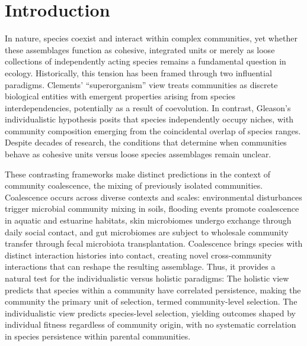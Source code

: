 \section{Introduction}
\label{sec:introduction}

In nature, species coexist and interact within complex communities, yet whether these assemblages function as cohesive, integrated units or merely as loose collections of independently acting species remains a fundamental question in ecology. Historically, this tension has been framed through two influential paradigms. Clements' ``superorganism'' view treats communities as discrete biological entities with emergent properties arising from species interdependencies, potentially as a result of coevolution\citep{Clements1916, Clements1936, Odum1969, Lovelock1979, WilsonSober1989}. In contrast, Gleason's individualistic hypothesis posits that species independently occupy niches, with community composition emerging from the coincidental overlap of species ranges\citep{Gleason1939, Cain1947, Mason1947, Whittaker1967}. Despite decades of research, the conditions that determine when communities behave as cohesive units versus loose species assemblages remain unclear.

These contrasting frameworks make distinct predictions in the context of community coalescence, the mixing of previously isolated communities\citep{Rillig2015, Lechon2021}. Coalescence occurs across diverse contexts and scales: environmental disturbances trigger microbial community mixing in soils\citep{Huet2023, Bresciani2025}, flooding events promote coalescence in aquatic and estuarine habitats\citep{Liu2024}, skin microbiomes undergo exchange through daily social contact\citep{Sarkar2024}, and gut microbiomes are subject to wholesale community transfer through fecal microbiota transplantation\citep{Xiao2020, Gupta2016}. Coalescence brings species with distinct interaction histories into contact, creating novel cross-community interactions that can reshape the resulting assemblage\citep{Rillig2015}. Thus, it provides a natural test for the individualistic versus holistic paradigms: The holistic view predicts that species within a community have correlated persistence, making the community the primary unit of selection, termed community-level selection. The individualistic view predicts species-level selection, yielding outcomes shaped by individual fitness regardless of community origin, with no systematic correlation in species persistence within parental communities.

